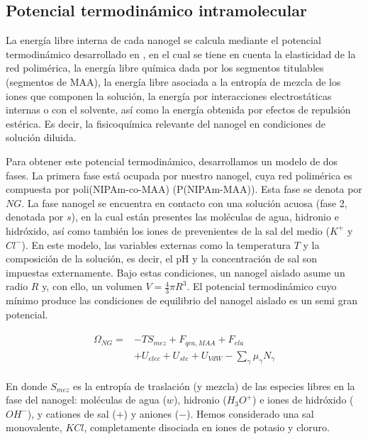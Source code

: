 	
	
	\subsection{Potencial termodin\'amico intramolecular}\label{sub:mc:omega}
	
	La energ\'ia libre interna de cada nanogel se calcula mediante el potencial termodin\'amico desarrollado en \cite{perez2021thermodynamic}, en el cual se tiene en cuenta  la elasticidad de la red polim\'erica, la energ\'ia libre qu\'imica dada por los segmentos titulables (segmentos de MAA), la energ\'ia libre asociada a la entrop\'ia de mezcla de los iones que componen la soluci\'on, la energ\'ia por interacciones electrost\'aticas internas o con el solvente, as\'i como la energ\'ia obtenida por efectos de repulsi\'on est\'erica. Es decir, la fisicoqu\'imica relevante del nanogel en condiciones de soluci\'on diluida.
	
	Para obtener este potencial termodin\'amico, desarrollamos un modelo de dos fases. La primera fase est\'a ocupada por nuestro nanogel, cuya red polim\'erica es compuesta por poli(NIPAm-co-MAA) (P(NIPAm-MAA)). Esta fase se denota por $NG$. La fase nanogel se encuentra en contacto con una soluci\'on acuosa (fase 2, denotada por $s$), en la cual est\'an presentes las mol\'eculas de agua, hidronio e hidr\'oxido, as\'i como tambi\'en los iones de prevenientes de la sal del medio ($K^+$ y $Cl^-$).
	En este modelo, las variables externas como la temperatura $T$ y la composici\'on de la soluci\'on, es decir, el pH y la concentraci\'on de sal son impuestas externamente. Bajo estas condiciones, un nanogel aislado asume un radio $R$ y, con ello, un volumen $V=\frac{4}{3}\pi R^3$.
	El potencial termodin\'amico cuyo m\'inimo produce las condiciones de equilibrio del nanogel aislado es un semi gran potencial.
	
	
	
	\begin{align}
		\begin{aligned}
			\Omega_{NG}=& -TS_{mez} + F_{qca,MAA} +  F_{ela}\\
			& + U_{elec}+  U_{ste} + U_{VdW} -{\sum_{\gamma}
				{\mu_\gamma N_\gamma}}
		\end{aligned}
		\label{eq:mc:free-energy-implicit}
	\end{align}
	
	
	\noindent En donde $S_{mez}$ es la entrop\'ia de traslaci\'on (y mezcla) de las especies libres en la fase del nanogel: mol\'eculas de agua ($w$), hidronio ($H_3O^+$) e iones de hidr\'oxido ($OH^-$), y cationes de sal ($+$) y aniones ($-$).
	Hemos considerado una sal monovalente, $KCl$,  completamente disociada en iones de potasio y cloruro.
	
